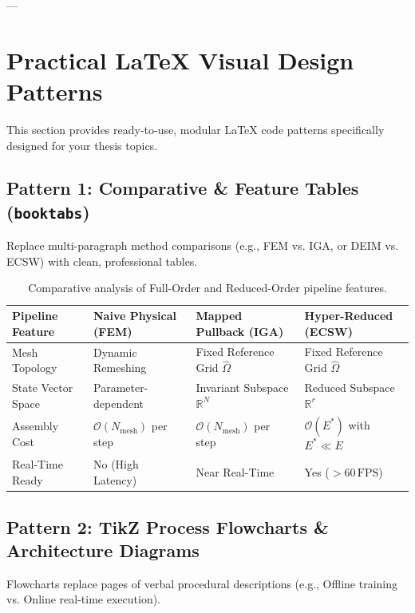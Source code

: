 \documentclass[12pt,a4paper]{article}
\begin{document}
---

\section{Practical LaTeX Visual Design Patterns}

This section provides ready-to-use, modular LaTeX code patterns specifically designed for your thesis topics.

\subsection{Pattern 1: Comparative \& Feature Tables (\texttt{booktabs})}
Replace multi-paragraph method comparisons (e.g., FEM vs. IGA, or DEIM vs. ECSW) with clean, professional tables.

\begin{table}[htbp]
    \centering
    \caption{Comparative analysis of Full-Order and Reduced-Order pipeline features.}
    \label{tab:pipeline_comparison_pattern}
    \begin{tabular}{l l l l}
        \toprule
        \textbf{Pipeline Feature} & \textbf{Naive Physical (FEM)} & \textbf{Mapped Pullback (IGA)} & \textbf{Hyper-Reduced (ECSW)} \\
        \midrule
        Mesh Topology & Dynamic Remeshing & Fixed Reference Grid $\hat{\Omega}$ & Fixed Reference Grid $\hat{\Omega}$ \\
        State Vector Space & Parameter-dependent & Invariant Subspace $\mathbb{R}^N$ & Reduced Subspace $\mathbb{R}^r$ \\
        Assembly Cost & $\mathcal{O}(N_{\text{mesh}})$ per step & $\mathcal{O}(N_{\text{mesh}})$ per step & $\mathcal{O}(E^*)$ with $E^* \ll E$ \\
        Real-Time Ready & No (High Latency) & Near Real-Time & Yes ($>60\,\text{FPS}$) \\
        \bottomrule
    \end{tabular}
\end{table}

\subsection{Pattern 2: TikZ Process Flowcharts \& Architecture Diagrams}
Flowcharts replace pages of verbal procedural descriptions (e.g., Offline training vs. Online real-time execution).
\end{document}
